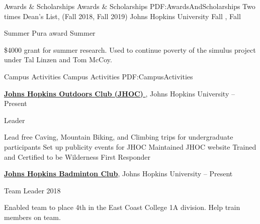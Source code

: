 \documentclass[letterpaper,MMMyyyy,nonstopmode,14pt]{simpleresumecv}
\begin{document}
\begin{Body}
\Section
{Awards \&\newline
Scholarships}
{Awards \& Scholarships}
{PDF:AwardsAndScholarships}
\BulletItem
Two times Dean's List,
(Fall 2018, Fall 2019) Johns Hopkins University
\hfill
Fall , Fall  

\BulletItem
Summer Pura award
\hfill
Summer 
\begin{Detail}
    \SubBulletItem \$4000 grant for summer research.
    \SubBulletItem Used to continue poverty of the simulus project under Tal Linzen and Tom McCoy. 
\end{Detail}


{
%	
%
%
}


\Section
{Campus Activities}
{Campus Activities}
{PDF:CampusActivities}

\Entry
\href{http://outdoors.johnshopkins.edu}
{\textbf{Johns Hopkins Outdoors Club (JHOC) }},
Johns Hopkins University
\hfill
{} --
Present

\Gap
\BulletItem
Leader
\begin{Detail}
\SubBulletItem
Lead free Caving, Mountain Biking, and Climbing trips for undergraduate participants
\SubBulletItem
Set up publicity events for  JHOC
\SubBulletItem
Maintained JHOC website
\SubBulletItem
Trained and Certified to be Wilderness First Responder
\end{Detail}

\Section
\Entry
\href{https://johnshopkins.campuslabs.com/engage/organization/jhubadminton}
{\textbf{Johns Hopkins Badminton Club}},
Johns Hopkins University
\hfill
{} --
Present

\Gap
\BulletItem
Team Leader
\hfill
2018
\begin{Detail}
	\SubBulletItem
	Enabled team to place 4th in the East Coast College 1A division. 
	\SubBulletItem
	Help train members on team.
\end{Detail}


\end{Body}
\end{document}
